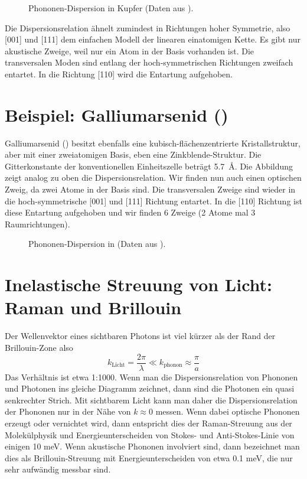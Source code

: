 	\begin{figure}
\caption{Phononen-Dispersion in Kupfer (Daten aus \cite{Svensson_cu}). \label{fig:phonon_kupfer}}
\end{figure}

Die Dispersionsrelation ähnelt zumindest in Richtungen hoher Symmetrie, also [001] und [111]	dem einfachen Modell der linearen einatomigen Kette. Es gibt nur akustische Zweige, weil nur ein Atom in der Basis vorhanden ist. Die transversalen Moden sind entlang der hoch-symmetrischen Richtungen zweifach entartet. In die Richtung [110] wird die Entartung aufgehoben.


\section{Beispiel: Galliumarsenid ()}


Galliumarsenid () besitzt ebenfalls eine kubisch-flächenzentrierte Kristallstruktur, aber mit einer zweiatomigen Basis, eben eine Zinkblende-Struktur. Die Gitterkonstante der konventionellen Einheitszelle beträgt 5.7~\AA. Die Abbildung zeigt analog zu oben die Dispersionsrelation. Wir finden nun auch einen optischen Zweig, da zwei Atome in der Basis sind. Die transversalen Zweige sind wieder in die hoch-symmetrische [001] und [111] Richtung entartet. In die [110] Richtung ist diese Entartung aufgehoben und wir finden 6 Zweige (2 Atome mal 3 Raumrichtungen).


\begin{figure}
\caption{Phononen-Dispersion in  (Daten aus \cite{Strauch_gaas}).}
\end{figure}



\section{Inelastische Streuung von Licht: Raman und Brillouin}

Der Wellenvektor eines sichtbaren Photons ist viel kürzer als der Rand der Brillouin-Zone also
\begin{equation}
 k_\text{Licht} = \frac{2 \pi}{\lambda} \ll k_\text{phonon} \approx \frac{\pi}{a}
\end{equation}
Das Verhältnis ist etwa 1:1000. Wenn man die Dispersionsrelation von Phononen und Photonen ins gleiche Diagramm zeichnet, dann sind die Photonen ein quasi senkrechter Strich. Mit sichtbarem Licht kann man daher die Dispersionsrelation der Phononen nur in der Nähe von $k \approx 0$ messen. Wenn dabei optische Phononen erzeugt oder vernichtet wird, dann entspricht dies der Raman-Streuung aus der Molekülphysik und Energieunterscheiden von Stokes- und Anti-Stokes-Linie von einigen 10 meV. Wenn akustische Phononen involviert sind, dann bezeichnet man dies als Brillouin-Streuung mit Energieunterscheiden von etwa 0.1 meV, die nur sehr aufwändig messbar sind.


